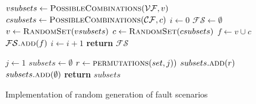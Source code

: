 \begin{figure}[H]
\centering
\begin{algorithmic}[1]
	\State $vsubsets \gets \Call{PossibleCombinations}{\mathcal{VF}, v}$
	\State $csubsets \gets \Call{PossibleCombinations}{\mathcal{CF}, c}$
	\State $i \gets 0$
	\State $\mathcal{FS} \gets \emptyset$
        \State $v \gets \Call{RandomSet}{vsubsets}$
        \State $c \gets \Call{RandomSet}{csubsets}$
        \State $f \gets v \cup c$
		\State $\mathcal{FS}.\Call{add}{f}$
		\State $i \gets i + 1$
	\EndIf
      \EndWhile
      \State \textbf{return} $\mathcal{FS}$
    \EndFunction

	\State $j \gets 1$
	\State $subsets \gets \emptyset$
		\State $r \gets \Call{permutations}{set, j)}$
		\State $subsets.\Call{add}{r}$
	\EndWhile
	\State $subsets.\Call{add}{\emptyset}$
	\State \textbf{return} $subsets$
\EndFunction
\end{algorithmic}
\caption[Implementation of random generation of fault scenarios]{Implementation of random generation of fault scenarios}
\label{alg:fault-gen-algo}
\end{figure}

